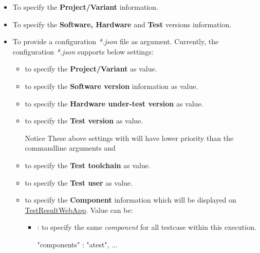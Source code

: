 \begin{itemize}
\item {}

  To specify the \textbf{Project/Variant} information.

\item {}

  To specify the \textbf{Software, Hardware} and \textbf{Test} versions information.

\item {}

  To provide a configuration \emph{*.json} file as  argument.
  Currently, the configuration \emph{*.json} supports below settings:

  \begin{itemize}
  \item {} to specify the \textbf{Project/Variant} as  value.
  \item {} to specify the \textbf{Software version} information as  value.
  \item {} to specify the \textbf{Hardware under-test version} as  value.
  \item {} to specify the \textbf{Test version} as  value.
  \begin{boxhint} {Notice}
    These above settings with  will have lower priority than the 
    commandline arguments  and 
  \end{boxhint}
  \item {} to specify the \textbf{Test toolchain} as  value.
  \item {} to specify the \textbf{Test user} as  value.
  \item {} to specify the \textbf{Component} information which will be 
        displayed on \href{https://github.com/test-fullautomation/testresultwebapp}
        {TestResultWebApp}. Value can be:
        \begin{itemize}
          \item 
            : to specify the same \emph{component} for all testcase
            within this execution.
\begin{robotcode}
{
  "components" : "atest",
  ...
}
\end{robotcode}

\end{itemize}
\end{itemize}
\end{itemize}
